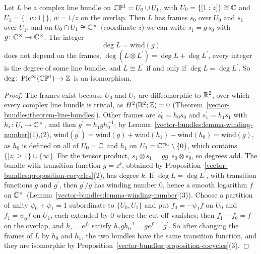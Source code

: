 \begin{proposition}\label{vector-bundles:proposition-line-bundles-sphere}
Let $L$ be a complex line bundle on $\mathbb{C}\mathbb{P}^1 = U_0 \cup U_1$, with $U_0 = \{[1 : z]\} \cong \mathbb{C}$ and $U_1 = \{[w : 1]\}$, $w = 1/z$ on the overlap. Then $L$ has frames $s_0$ over
$U_0$ and $s_1$ over $U_1$, and on $U_0 \cap U_1 \cong \mathbb{C}^\times$ (coordinate $z$) we can write $s_1 = g\,s_0$ with $g \colon \mathbb{C}^\times \to \mathbb{C}^\times$. The integer
\[
\deg L = \mathrm{wind}(g)
\]
does not depend on the frames, $\deg(L \otimes L^{\prime}) = \deg L + \deg L^{\prime}$, every integer is the degree of some line bundle, and $L \cong L^{\prime}$ if and only if
$\deg L = \deg L^{\prime}$. So $\deg \colon \operatorname{Pic}^\infty(\mathbb{C}\mathbb{P}^1) \to \mathbb{Z}$ is an isomorphism.
\end{proposition}

\begin{proof}
The frames exist because $U_0$ and $U_1$ are diffeomorphic to $\mathbb{R}^2$, over which every complex line bundle is trivial, as $H^2(\mathbb{R}^2; \mathbb{Z}) = 0$
(Theorem~\ref{vector-bundles:theorem-line-bundles}). Other frames are $s^{\prime}_0 = h_0s_0$ and $s^{\prime}_1 = h_1s_1$ with $h_i \colon U_i \to \mathbb{C}^\times$, and then
$g^{\prime} = h_1gh_0^{-1}$; by Lemma~\ref{vector-bundles:lemma-winding-number}(1),(2), $\mathrm{wind}(g^{\prime}) = \mathrm{wind}(g) + \mathrm{wind}(h_1) - \mathrm{wind}(h_0) = \mathrm{wind}(g)$, as $h_0$ is
defined on all of $U_0 = \mathbb{C}$ and $h_1$ on $U_1 = \mathbb{C}\mathbb{P}^1 \setminus \{0\}$, which contains $\{|z| \geq 1\} \cup \{\infty\}$. For the tensor product, $s_1 \otimes s^{\prime}_1 = gg^{\prime}\,s_0 \otimes s^{\prime}_0$, so
degrees add. The bundle with transition function $g = z^k$, obtained by Proposition~\ref{vector-bundles:proposition-cocycles}(2), has degree $k$. If $\deg L = \deg L^{\prime}$, with transition
functions $g$ and $g^{\prime}$, then $g^{\prime}/g$ has winding number $0$, hence a smooth logarithm $f$ on $\mathbb{C}^\times$ (Lemma~\ref{vector-bundles:lemma-winding-number}(3)). Choose a partition of unity
$\psi_0 + \psi_1 = 1$ subordinate to $\{U_0, U_1\}$ and put $f_0 = -\psi_1f$ on $U_0$ and $f_1 = \psi_0f$ on $U_1$, each extended by $0$ where the cut-off vanishes; then $f_1 - f_0 = f$ on the
overlap, and $h_i = e^{f_i}$ satisfy $h_1gh_0^{-1} = ge^{f} = g^{\prime}$. So after changing the frames of $L$ by $h_0$ and $h_1$, the two bundles have the same transition function, and they are
isomorphic by Proposition~\ref{vector-bundles:proposition-cocycles}(3).
\end{proof}

